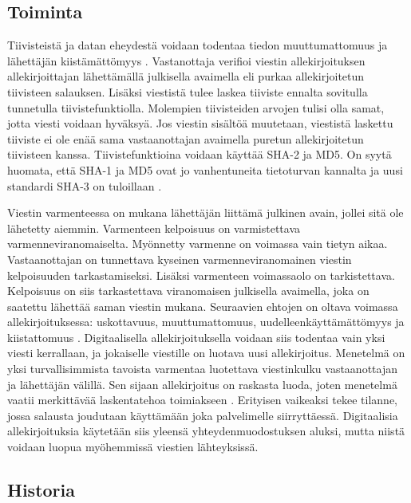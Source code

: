 \documentclass[finnish]{tktltiki2}
\theoremstyle{definition}
\theoremstyle{remark}
\begin{document}
\subsection{Toiminta} 

Tiivisteistä ja datan eheydestä voidaan todentaa tiedon muuttumattomuus ja lähettäjän kiistämättömyys \cite{moen}. Vastanottaja verifioi viestin allekirjoituksen allekirjoittajan lähettämällä julkisella avaimella eli purkaa allekirjoitetun tiivisteen salauksen. Lisäksi viestistä tulee laskea tiiviste ennalta sovitulla tunnetulla tiivistefunktiolla. Molempien tiivisteiden arvojen tulisi olla samat, jotta viesti voidaan hyväksyä. Jos viestin sisältöä muutetaan, viestistä laskettu tiiviste ei ole enää sama vastaanottajan avaimella puretun allekirjoitetun tiivisteen kanssa. Tiivistefunktioina voidaan käyttää SHA-2 ja MD5. On syytä huomata, että SHA-1 ja MD5 ovat jo vanhentuneita tietoturvan kannalta ja uusi standardi SHA-3 on tuloillaan \cite{nist}.   

Viestin varmenteessa on mukana lähettäjän liittämä julkinen avain, jollei sitä ole lähetetty aiemmin. Varmenteen kelpoisuus on varmistettava varmenneviranomaiselta. Myönnetty varmenne on voimassa vain tietyn aikaa. Vastaanottajan on tunnettava kyseinen varmenneviranomainen viestin kelpoisuuden tarkastamiseksi. Lisäksi varmenteen voimassaolo on tarkistettava. Kelpoisuus on siis tarkastettava viranomaisen julkisella avaimella, joka on saatettu lähettää saman viestin mukana. Seuraavien ehtojen on oltava voimassa allekirjoituksessa: uskottavuus, muuttumattomuus, uudelleenkäyttämättömyys ja kiistattomuus \cite{e-c}. Digitaalisella allekirjoituksella voidaan siis todentaa vain yksi viesti kerrallaan, ja jokaiselle viestille on luotava uusi allekirjoitus. Menetelmä on yksi turvallisimmista tavoista varmentaa luotettava viestinkulku vastaanottajan ja lähettäjän välillä. Sen sijaan allekirjoitus on raskasta luoda, joten menetelmä vaatii merkittävää laskentatehoa toimiakseen \cite{proxy}. Erityisen vaikeaksi tekee tilanne, jossa salausta joudutaan käyttämään joka palvelimelle siirryttäessä. Digitaalisia allekirjoituksia käytetään siis yleensä yhteydenmuodostuksen aluksi, mutta niistä voidaan luopua myöhemmissä viestien lähteyksissä.

\subsection{Historia}
\end{document}
